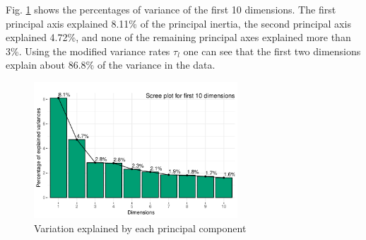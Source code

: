 \documentclass[conference,final,]{IEEEtran}
\begin{document}
Fig. \ref{fig:screeplot} shows the percentages of variance of the first
10 dimensions. The first principal axis explained 8.11\% of the
principal inertia, the second principal axis explained 4.72\%, and none
of the remaining principal axes explained more than 3\%. Using the
modified variance rates \(\tau_l\) one can see that the first two
dimensions explain about 86.8\% of the variance in the data.

\begin{figure}[!ht] 
\centering 
\includegraphics[width=3in]{../figs/screeplot.pdf}
\caption{Variation explained by each principal component}
\label{fig:screeplot} 
\end{figure}
\end{document}

